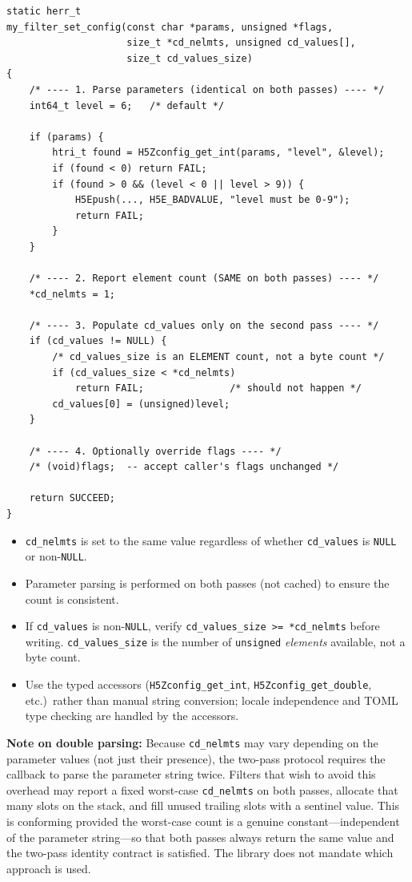 \documentclass[../RFC-HDFG-2026-001.tex]{subfiles}
\begin{document}
\begin{verbatim}
static herr_t
my_filter_set_config(const char *params, unsigned *flags,
                     size_t *cd_nelmts, unsigned cd_values[],
                     size_t cd_values_size)
{
    /* ---- 1. Parse parameters (identical on both passes) ---- */
    int64_t level = 6;   /* default */

    if (params) {
        htri_t found = H5Zconfig_get_int(params, "level", &level);
        if (found < 0) return FAIL;
        if (found > 0 && (level < 0 || level > 9)) {
            H5Epush(..., H5E_BADVALUE, "level must be 0-9");
            return FAIL;
        }
    }

    /* ---- 2. Report element count (SAME on both passes) ---- */
    *cd_nelmts = 1;

    /* ---- 3. Populate cd_values only on the second pass ---- */
    if (cd_values != NULL) {
        /* cd_values_size is an ELEMENT count, not a byte count */
        if (cd_values_size < *cd_nelmts)
            return FAIL;               /* should not happen */
        cd_values[0] = (unsigned)level;
    }

    /* ---- 4. Optionally override flags ---- */
    /* (void)flags;  -- accept caller's flags unchanged */

    return SUCCEED;
}
\end{verbatim}

\begin{itemize}
\item \texttt{cd\_nelmts} is set to the same value regardless of whether
  \texttt{cd\_values} is \texttt{NULL} or non-\texttt{NULL}.
\item Parameter parsing is performed on both passes (not cached) to
  ensure the count is consistent.
\item If \texttt{cd\_values} is non-\texttt{NULL}, verify
  \texttt{cd\_values\_size >= *cd\_nelmts} before writing.
  \texttt{cd\_values\_size} is the number of \texttt{unsigned} \emph{elements}
  available, not a byte count.
\item Use the typed accessors (\texttt{H5Zconfig\_get\_int},
  \texttt{H5Zconfig\_get\_double}, etc.)\ rather than manual string conversion;
  locale independence and TOML type checking are handled by the accessors.
\end{itemize}

\textbf{Note on double parsing:} Because \texttt{cd\_nelmts} may vary depending on
the parameter values (not just their presence), the two-pass protocol requires
the callback to parse the parameter string twice.  Filters that wish to avoid
this overhead may report a fixed worst-case \texttt{cd\_nelmts} on both passes,
allocate that many slots on the stack, and fill unused trailing slots with a
sentinel value.  This is conforming provided the worst-case count is a genuine
constant---independent of the parameter string---so that both passes always
return the same value and the two-pass identity contract is satisfied.
The library does not mandate which approach is used.
\end{document}
